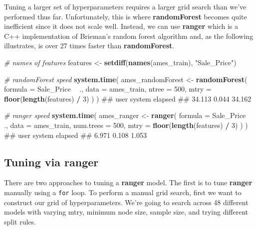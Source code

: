 \documentclass[]{book}
\newenvironment{Shaded}{\begin{snugshade}}{\end{snugshade}}
\newcommand{\CommentTok}[1]{\textcolor[rgb]{0.56,0.35,0.01}{\textit{#1}}}
\newcommand{\DataTypeTok}[1]{\textcolor[rgb]{0.13,0.29,0.53}{#1}}
\newcommand{\DecValTok}[1]{\textcolor[rgb]{0.00,0.00,0.81}{#1}}
\newcommand{\KeywordTok}[1]{\textcolor[rgb]{0.13,0.29,0.53}{\textbf{#1}}}
\newcommand{\NormalTok}[1]{#1}
\newcommand{\OperatorTok}[1]{\textcolor[rgb]{0.81,0.36,0.00}{\textbf{#1}}}
\newcommand{\StringTok}[1]{\textcolor[rgb]{0.31,0.60,0.02}{#1}}
\theoremstyle{definition}
\theoremstyle{definition}
\theoremstyle{definition}
\theoremstyle{remark}
\begin{document}
Tuning a larger set of hyperparameters requires a larger grid search
than we've performed thus far. Unfortunately, this is where
\textbf{randomForest} becomes quite inefficient since it does not scale
well. Instead, we can use \textbf{ranger} \citep{R-ranger} which is a
C++ implementation of Brieman's random forest algorithm and, as the
following illustrates, is over 27 times faster than
\textbf{randomForest}.

\begin{Shaded}
\begin{Highlighting}[]
\CommentTok{# names of features}
\NormalTok{features <-}\StringTok{ }\KeywordTok{setdiff}\NormalTok{(}\KeywordTok{names}\NormalTok{(ames_train), }\StringTok{"Sale_Price"}\NormalTok{)}

\CommentTok{# randomForest speed}
\KeywordTok{system.time}\NormalTok{(}
\NormalTok{  ames_randomForest <-}\StringTok{ }\KeywordTok{randomForest}\NormalTok{(}
    \DataTypeTok{formula =}\NormalTok{ Sale_Price }\OperatorTok{~}\StringTok{ }\NormalTok{., }
    \DataTypeTok{data    =}\NormalTok{ ames_train, }
    \DataTypeTok{ntree   =} \DecValTok{500}\NormalTok{,}
    \DataTypeTok{mtry    =} \KeywordTok{floor}\NormalTok{(}\KeywordTok{length}\NormalTok{(features) }\OperatorTok{/}\StringTok{ }\DecValTok{3}\NormalTok{)}
\NormalTok{  )}
\NormalTok{)}
\NormalTok{##    user  system elapsed }
\NormalTok{##  34.113   0.044  34.162}

\CommentTok{# ranger speed}
\KeywordTok{system.time}\NormalTok{(}
\NormalTok{  ames_ranger <-}\StringTok{ }\KeywordTok{ranger}\NormalTok{(}
    \DataTypeTok{formula   =}\NormalTok{ Sale_Price }\OperatorTok{~}\StringTok{ }\NormalTok{., }
    \DataTypeTok{data      =}\NormalTok{ ames_train, }
    \DataTypeTok{num.trees =} \DecValTok{500}\NormalTok{,}
    \DataTypeTok{mtry      =} \KeywordTok{floor}\NormalTok{(}\KeywordTok{length}\NormalTok{(features) }\OperatorTok{/}\StringTok{ }\DecValTok{3}\NormalTok{)}
\NormalTok{  )}
\NormalTok{)}
\NormalTok{##    user  system elapsed }
\NormalTok{##   6.971   0.108   1.053}
\end{Highlighting}
\end{Shaded}

\hypertarget{tuning-via-ranger}{%
\subsection{Tuning via ranger}\label{tuning-via-ranger}}

There are two approaches to tuning a \textbf{ranger} model. The first is
to tune \textbf{ranger} manually using a \texttt{for} loop. To perform a
manual grid search, first we want to construct our grid of
hyperparameters. We're going to search across 48 different models with
varying mtry, minimum node size, sample size, and trying different split
rules.
\end{document}
